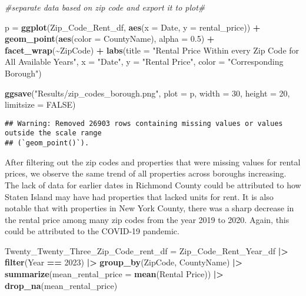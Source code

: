 \documentclass[
]{article}
\newenvironment{Shaded}{\begin{snugshade}}{\end{snugshade}}
\newcommand{\AttributeTok}[1]{\textcolor[rgb]{0.13,0.29,0.53}{#1}}
\newcommand{\CommentTok}[1]{\textcolor[rgb]{0.56,0.35,0.01}{\textit{#1}}}
\newcommand{\ConstantTok}[1]{\textcolor[rgb]{0.56,0.35,0.01}{#1}}
\newcommand{\DecValTok}[1]{\textcolor[rgb]{0.00,0.00,0.81}{#1}}
\newcommand{\FloatTok}[1]{\textcolor[rgb]{0.00,0.00,0.81}{#1}}
\newcommand{\FunctionTok}[1]{\textcolor[rgb]{0.13,0.29,0.53}{\textbf{#1}}}
\newcommand{\NormalTok}[1]{#1}
\newcommand{\OtherTok}[1]{\textcolor[rgb]{0.56,0.35,0.01}{#1}}
\newcommand{\SpecialCharTok}[1]{\textcolor[rgb]{0.81,0.36,0.00}{\textbf{#1}}}
\newcommand{\StringTok}[1]{\textcolor[rgb]{0.31,0.60,0.02}{#1}}
\begin{document}
\begin{Shaded}
\begin{Highlighting}[]
\CommentTok{\#separate data based on zip code and export it to plot\#}

\NormalTok{p }\OtherTok{=} \FunctionTok{ggplot}\NormalTok{(Zip\_Code\_Rent\_df, }\FunctionTok{aes}\NormalTok{(}\AttributeTok{x =}\NormalTok{ Date, }\AttributeTok{y =}\NormalTok{ rental\_price)) }\SpecialCharTok{+} \FunctionTok{geom\_point}\NormalTok{(}\FunctionTok{aes}\NormalTok{(}\AttributeTok{color =}\NormalTok{ CountyName), }\AttributeTok{alpha =} \FloatTok{0.5}\NormalTok{) }\SpecialCharTok{+} \FunctionTok{facet\_wrap}\NormalTok{(}\SpecialCharTok{\textasciitilde{}}\NormalTok{ZipCode) }\SpecialCharTok{+} \FunctionTok{labs}\NormalTok{(}\AttributeTok{title =} \StringTok{"Rental Price Within every Zip Code for All Available Years"}\NormalTok{, }\AttributeTok{x =} \StringTok{"Date"}\NormalTok{, }\AttributeTok{y =} \StringTok{"Rental Price"}\NormalTok{, }\AttributeTok{color =} \StringTok{"Corresponding Borough"}\NormalTok{)}

\FunctionTok{ggsave}\NormalTok{(}\StringTok{"Results/zip\_codes\_borough.png"}\NormalTok{, }\AttributeTok{plot =}\NormalTok{ p, }\AttributeTok{width =} \DecValTok{30}\NormalTok{, }\AttributeTok{height =} \DecValTok{20}\NormalTok{, }\AttributeTok{limitsize =} \ConstantTok{FALSE}\NormalTok{)}
\end{Highlighting}
\end{Shaded}

\begin{verbatim}
## Warning: Removed 26903 rows containing missing values or values outside the scale range
## (`geom_point()`).
\end{verbatim}

After filtering out the zip codes and properties that were missing
values for rental prices, we observe the same trend of all properties
across boroughs increasing. The lack of data for earlier dates in
Richmond County could be attributed to how Staten Island may have had
properties that lacked units for rent. It is also notable that with
properties in New York County, there was a sharp decrease in the rental
price among many zip codes from the year 2019 to 2020. Again, this could
be attributed to the COVID-19 pandemic.

\begin{Shaded}
\begin{Highlighting}[]
\NormalTok{Twenty\_Twenty\_Three\_Zip\_Code\_rent\_df }\OtherTok{=}\NormalTok{ Zip\_Code\_Rent\_Year\_df }\SpecialCharTok{|\textgreater{}} \FunctionTok{filter}\NormalTok{(Year }\SpecialCharTok{==} \DecValTok{2023}\NormalTok{) }\SpecialCharTok{|\textgreater{}} \FunctionTok{group\_by}\NormalTok{(ZipCode, CountyName) }\SpecialCharTok{|\textgreater{}}  \FunctionTok{summarize}\NormalTok{(}\AttributeTok{mean\_rental\_price =} \FunctionTok{mean}\NormalTok{(}\StringTok{\textasciigrave{}}\AttributeTok{Rental Price}\StringTok{\textasciigrave{}}\NormalTok{)) }\SpecialCharTok{|\textgreater{}} \FunctionTok{drop\_na}\NormalTok{(mean\_rental\_price)}
\end{Highlighting}
\end{Shaded}
\end{document}
